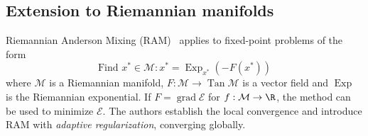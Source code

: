 \documentclass{article} %
\numberwithin{equation}{subsection}
\numberwithin{theorem}{section}
\newcommand{\cE}{\mathcal{E}}
\newcommand{\cM}{\mathcal{M}}
\newcommand{\rExp}{\operatorname{Exp}}
\begin{document}

        
        \subsection{Extension to Riemannian manifolds}
            Riemannian Anderson Mixing (RAM)~\cite{li2023riemannian} applies to fixed-point problems of the form
            \begin{equation}\label{eq:fp_riemannian}
                \text{Find } x^* \in \cM: x^* = \rExp_{x^*}\left( -F(x^*)\right)
            \end{equation}
            where $\cM$ is a Riemannian manifold, $F : \cM \to \operatorname{Tan}\cM $ is a vector field and $\rExp$ is the Riemannian exponential.
            If $F = \operatorname{grad}\cE$ for $f: \cM \to \R$, the method can be used to minimize $\cE$.
            The authors establish the local convergence and introduce RAM with \emph{adaptive regularization}, converging globally.
            
\end{document}
